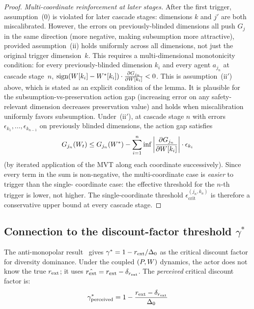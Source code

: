 \begin{proof}
\emph{Multi-coordinate reinforcement at later stages.}
After the first trigger, assumption~(0) is violated for later
cascade stages: dimensions $k$ and $j'$ are both miscalibrated.
However, the errors on previously-blinded dimensions all push $G_j$
in the same direction (more negative, making subsumption more
attractive), provided assumption~(ii) holds uniformly across all
dimensions, not just the original trigger dimension~$k$.  This
requires a multi-dimensional monotonicity condition: for every
previously-blinded dimension $k_i$ and every agent $a_{j_n}$ at
cascade stage~$n$,
$\operatorname{sign}(W[k_i] - W^*[k_i]) \cdot
\frac{\partial G_{j_n}}{\partial W[k_i]} < 0$.
This is assumption~(ii$'$) above, which is stated as an explicit
condition of the lemma.  It is plausible for the
subsumption-vs-preservation action gap (increasing error on any
safety-relevant dimension decreases preservation value) and holds
when miscalibration uniformly favors subsumption.  Under~(ii$'$), at
cascade stage $n$ with errors $\epsilon_{k_1}, \ldots,
\epsilon_{k_{n-1}}$ on previously blinded dimensions, the action gap
satisfies
\begin{equation*}
G_{j_n}(W_t) \leq G_{j_n}(W^*) - \sum_{i=1}^{n}
  \inf \left|\frac{\partial G_{j_n}}{\partial W[k_i]}\right|
  \cdot \epsilon_{k_i}
\end{equation*}
(by iterated application of the MVT along each coordinate
successively).  Since every term in the sum is non-negative, the
multi-coordinate case is \emph{easier} to trigger than the single-
coordinate case: the effective threshold for the $n$-th trigger
is lower, not higher.  The single-coordinate threshold
$\epsilon_{\mathrm{crit}}^{(j_n,k_n)}$ is therefore a conservative upper bound
at every cascade stage.
\end{proof}

\subsection{Connection to the discount-factor threshold $\gamma^*$}
\label{app:gamma_star}

The anti-monopolar result~\citep[Proposition~6]{lasser2026horizon} gives $\gamma^* = 1 - r_{\mathrm{ext}} / \Delta_0$ as the
critical discount factor for diversity dominance.  Under the coupled
$(P, W)$ dynamics, the actor does not know the true $r_{\mathrm{ext}}$; it uses
$\hat{r_{\mathrm{ext}}} = r_{\mathrm{ext}} - \delta_{r_{\mathrm{ext}}}$.  The \emph{perceived}
critical discount factor is:
\begin{equation}
\label{eq:perceived_gamma}
\gamma^*_{\mathrm{perceived}} = 1 -
  \frac{r_{\mathrm{ext}} - \delta_{r_{\mathrm{ext}}}}{\Delta_0}
\end{equation}

